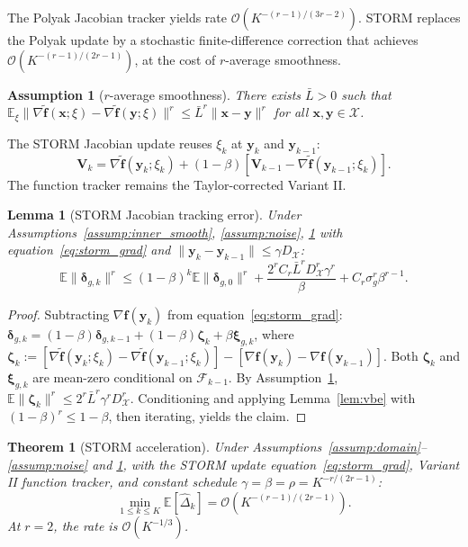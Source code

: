\documentclass{article}
\def\eqref#1{equation~\ref{#1}}
\newcommand{\cX}{\mathcal{X}}
\def\vf{{\bm{f}}}
\def\vx{{\bm{x}}}
\def\vy{{\bm{y}}}
\def\mV{{\bm{V}}}
\newcommand{\E}{\mathbb{E}}
\newtheorem{theorem}{Theorem}
\newtheorem{lemma}{Lemma}
\newtheorem{assumption}{Assumption}
\begin{document}
The Polyak Jacobian tracker yields rate $\mathcal{O}(K^{-(r-1)/(3r-2)})$. STORM replaces the Polyak update by a stochastic finite-difference correction that achieves $\mathcal{O}(K^{-(r-1)/(2r-1)})$, at the cost of $r$-average smoothness.

\begin{assumption}[$r$-average smoothness] \label{assump:avg_smooth}
There exists $\bar L > 0$ such that $\E_\xi\|\nabla\tilde\vf(\vx; \xi) - \nabla\tilde\vf(\vy; \xi)\|^r \le \bar L^r \|\vx - \vy\|^r$ for all $\vx, \vy \in \cX$.
\end{assumption}

The STORM Jacobian update reuses $\xi_k$ at $\vy_k$ and $\vy_{k-1}$:
\begin{equation} \label{eq:storm_grad}
\mV_k = \nabla\tilde\vf(\vy_k; \xi_k) + (1-\beta)[\mV_{k-1} - \nabla\tilde\vf(\vy_{k-1}; \xi_k)].
\end{equation}
The function tracker remains the Taylor-corrected Variant II.

\begin{lemma}[STORM Jacobian tracking error] \label{lem:storm_tracker}
Under Assumptions~\ref{assump:inner_smooth}, \ref{assump:noise}, \ref{assump:avg_smooth} with \eqref{eq:storm_grad} and $\|\vy_k - \vy_{k-1}\| \le \gamma D_\cX$:
\[
\E\|\bm\delta_{g,k}\|^r \le (1-\beta)^k \E\|\bm\delta_{g,0}\|^r + \frac{2^r C_r \bar L^r D_\cX^r \gamma^r}{\beta} + C_r \sigma_g^r \beta^{r-1}.
\]
\end{lemma}

\begin{proof}
Subtracting $\nabla\vf(\vy_k)$ from \eqref{eq:storm_grad}: $\bm\delta_{g,k} = (1-\beta)\bm\delta_{g,k-1} + (1-\beta)\bm\zeta_k + \beta\bm\xi_{g,k}$, where $\bm\zeta_k := [\nabla\tilde\vf(\vy_k; \xi_k) - \nabla\tilde\vf(\vy_{k-1}; \xi_k)] - [\nabla\vf(\vy_k) - \nabla\vf(\vy_{k-1})]$. Both $\bm\zeta_k$ and $\bm\xi_{g,k}$ are mean-zero conditional on $\mathcal{F}_{k-1}$. By Assumption~\ref{assump:avg_smooth}, $\E\|\bm\zeta_k\|^r \le 2^r \bar L^r \gamma^r D_\cX^r$. Conditioning and applying Lemma~\ref{lem:vbe} with $(1-\beta)^r \le 1-\beta$, then iterating, yields the claim.
\end{proof}

\begin{theorem}[STORM acceleration] \label{thm:storm_rate}
Under Assumptions~\ref{assump:domain}--\ref{assump:noise} and \ref{assump:avg_smooth}, with the STORM update \eqref{eq:storm_grad}, Variant II function tracker, and constant schedule $\gamma = \beta = \rho = K^{-r/(2r-1)}$:
\[
\min_{1 \le k \le K} \E[\hat\Delta_k] = \mathcal{O}\!\left(K^{-(r-1)/(2r-1)}\right).
\]
At $r = 2$, the rate is $\mathcal{O}(K^{-1/3})$.
\end{theorem}
\end{document}
